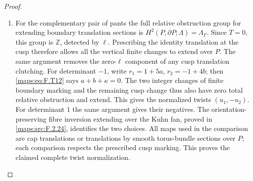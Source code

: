 \begin{proof}
\begin{enumerate}[label={$\langle1\rangle$\arabic*.}]
\item For the complementary pair of pants the full relative
obstruction group for extending boundary translation
sections is
$H^2(P,\partial P;\Lambda)=\Lambda_\Gamma$.
Since $T=0$, this group is $\mathbb Z$, detected by $\ell$.
Prescribing the identity translation at the cusp therefore
allows all the vertical finite changes to extend over $P$.
The same argument removes the zero-$\ell$ component of
any cusp translation clutching.
For determinant $-1$, write
$r_1=1+5a$, $r_2=-1+4b$; then \eqref{maps:eq:F.T12} says
$a+b+\kappa=0$.
The two integer changes of finite boundary marking and
the remaining cusp change thus also have zero total
relative obstruction and extend.
This gives the normalized twists $(u_1,-u_2)$.
For determinant $1$ the same argument gives their negatives.
The orientation-preserving fibre inversion extending over
the Kuhn fan, proved in \ref{maps:src:F.2.24}, identifies the two choices.
All maps used in the comparison are cap translations or
translations by smooth torus-bundle sections over $P$;
each comparison respects the prescribed cusp marking.
This proves the claimed complete twist normalization.

\end{enumerate}
\end{proof}




